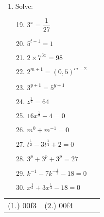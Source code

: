 \begin{eocexercises}{}
\begin{enumerate}[label=\textbf{\arabic*}., itemsep=5pt]
  \item Solve:
    \begin{multicols}{2}
      \begin{enumerate}[label=\textbf{(\alph*)}, itemsep=7pt]
        \setcounter{enumi}{18}
      \item $ 3^x = \dfrac{1}{27} $
      \item $ 5^{t-1} = 1 $
      \item $ 2 \times 7^{3x} = 98 $
      \item $ 2^{m+1} = (0,5)^{m-2}$
      \item $ 3^{y+1} = 5^{y+1} $
      \item $ z^{\frac{3}{2}} = 64 $
      \item $ 16x^{\frac{1}{2}} - 4 = 0 $
      \item $ m^0 + m^{-1} = 0 $
      \item $ t^{\frac{1}{2}} - 3t^{\frac{1}{4}} + 2 = 0 $
      \item $ 3^p + 3^p + 3^p = 27 $
      \item $ k^{-1} - 7k^{-\frac{1}{2}} -18 = 0 $
      \item $ x^{\frac{1}{2}}+3x^{\frac{1}{4}}-18 = 0 $
      \end{enumerate}
    \end{multicols}
  \end{enumerate}
\practiceinfo
\par 
\begin{tabular}[h]{ccccc}
(1.) 00f3& (2.) 00f4\end{tabular}
\end{eocexercises}

 
